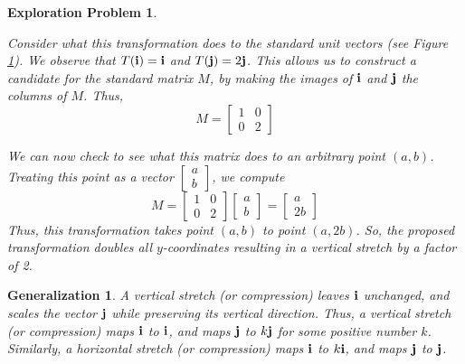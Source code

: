 \documentclass{ximera}
\renewcommand{\vec}[1]{{\bf #1}}
\newtheorem{general}{Generalization}
\newtheorem{initprob}{Exploration Problem}
\begin{document}
\begin{initprob}
\begin{image}[4in]
\end{image}
  \label{fig:vstretchvectors} 
Consider what this transformation does to the standard unit vectors (see Figure \ref{fig:vstretchvectors}).  We observe that $T(\vec{i})=\vec{i}$ and $T(\vec{j})=2\vec{j}$.  This allows us to construct a candidate for the standard matrix $M$, by making the images of $\vec{i}$ and $\vec{j}$ the columns of $M$.  Thus, 
$$M=\begin{bmatrix}
1 & 0\\
0 & 2
\end{bmatrix}$$

We can now check to see what this matrix does to an arbitrary point $(a, b)$.  Treating this point as a vector $\begin{bmatrix}a\\b\end{bmatrix}$, we compute
$$M=\begin{bmatrix}
1 & 0\\
0 & 2
\end{bmatrix}\begin{bmatrix}a\\b\end{bmatrix}=\begin{bmatrix}a\\2b\end{bmatrix}$$
 Thus, this transformation takes point $(a, b)$ to point $(a, 2b)$.  So, the proposed transformation doubles all $y$-coordinates resulting in a vertical stretch by a factor of 2.
\end{initprob}






\begin{general} A vertical stretch (or compression) leaves $\vec{i}$ unchanged, and scales the vector $\vec{j}$ while preserving its vertical direction.  Thus, a vertical stretch (or compression) maps $\vec{i}$ to $\vec{i}$, and maps $\vec{j}$ to $k\vec{j}$ for some positive number $k$.  Similarly, a horizontal stretch (or compression) maps $\vec{i}$ to $k\vec{i}$, and maps $\vec{j}$ to $\vec{j}$.
\end{general}
\end{document}

